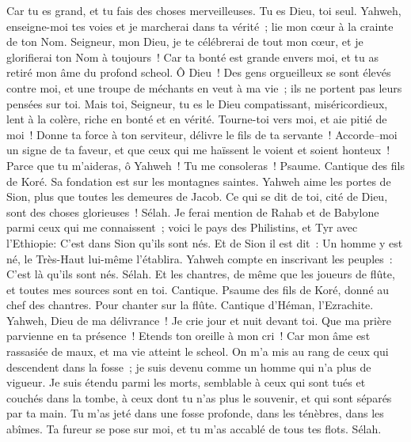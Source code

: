 \begin{multicols}{2}
Car tu es grand, et tu fais des choses merveilleuses. Tu es Dieu, toi seul.
Yahweh, enseigne-moi tes voies et je marcherai dans ta vérité~; lie mon cœur à la crainte de ton Nom.
Seigneur, mon Dieu, je te célébrerai de tout mon cœur, et je glorifierai ton Nom à toujours~!
Car ta bonté est grande envers moi, et tu as retiré mon âme du profond scheol.
Ô Dieu~! Des gens orgueilleux se sont élevés contre moi, et une troupe de méchants en veut à ma vie~; ils ne portent pas leurs pensées sur toi.
Mais toi, Seigneur, tu es le Dieu compatissant, miséricordieux, lent à la colère, riche en bonté et en vérité.
Tourne-toi vers moi, et aie pitié de moi~! Donne ta force à ton serviteur, délivre le fils de ta servante~!
Accorde–moi un signe de ta faveur, et que ceux qui me haïssent le voient et soient honteux~! Parce que tu m'aideras, ô Yahweh~! Tu me consoleras~!
\VerseOne{}Psaume. Cantique des fils de Koré. Sa fondation est sur les montagnes saintes.
Yahweh aime les portes de Sion, plus que toutes les demeures de Jacob.
Ce qui se dit de toi, cité de Dieu, sont des choses glorieuses~! Sélah.
Je ferai mention de Rahab et de Babylone parmi ceux qui me connaissent~; voici le pays des Philistins, et Tyr avec l'Ethiopie: C'est dans Sion qu'ils sont nés.
Et de Sion il est dit~: Un homme y est né, le Très-Haut lui-même l'établira.
Yahweh compte en inscrivant les peuples~: C'est là qu'ils sont nés. Sélah.
Et les chantres, de même que les joueurs de flûte, et toutes mes sources sont en toi.
\VerseOne{}Cantique. Psaume des fils de Koré, donné au chef des chantres. Pour chanter sur la flûte. Cantique d'Héman, l'Ezrachite.
Yahweh, Dieu de ma délivrance~! Je crie jour et nuit devant toi.
Que ma prière parvienne en ta présence~! Etends ton oreille à mon cri~!
Car mon âme est rassasiée de maux, et ma vie atteint le scheol.
On m'a mis au rang de ceux qui descendent dans la fosse~; je suis devenu comme un homme qui n'a plus de vigueur.
Je suis étendu parmi les morts, semblable à ceux qui sont tués et couchés dans la tombe, à ceux dont tu n'as plus le souvenir, et qui sont séparés par ta main.
Tu m'as jeté dans une fosse profonde, dans les ténèbres, dans les abîmes.
Ta fureur se pose sur moi, et tu m'as accablé de tous tes flots. Sélah.

\end{multicols}
